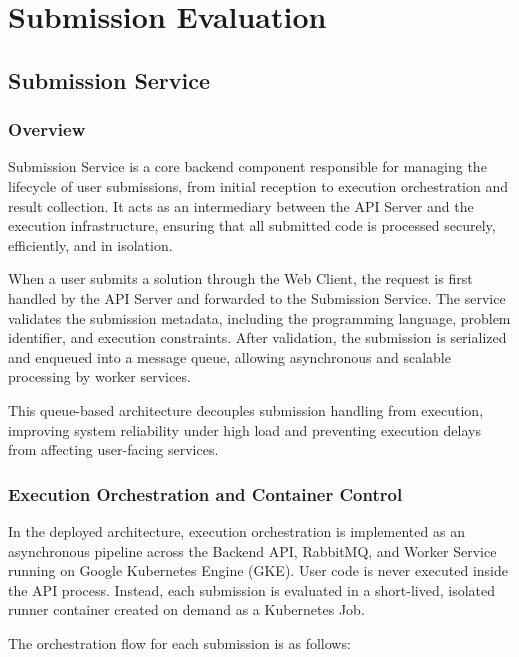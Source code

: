 \section{Submission Evaluation}

\subsection{Submission Service}
\subsubsection{Overview}
Submission Service is a core backend component responsible for managing the lifecycle of user submissions, from initial reception to execution orchestration and result collection. It acts as an intermediary between the API Server and the execution infrastructure, ensuring that all submitted code is processed securely, efficiently, and in isolation.

When a user submits a solution through the Web Client, the request is first handled by the API Server and forwarded to the Submission Service. The service validates the submission metadata, including the programming language, problem identifier, and execution constraints. After validation, the submission is serialized and enqueued into a message queue, allowing asynchronous and scalable processing by worker services.

This queue-based architecture decouples submission handling from execution, improving system reliability under high load and preventing execution delays from affecting user-facing services.

\subsubsection{Execution Orchestration and Container Control}
In the deployed architecture, execution orchestration is implemented as an asynchronous pipeline across the Backend API, RabbitMQ, and Worker Service running on Google Kubernetes Engine (GKE). User code is never executed inside the API process. Instead, each submission is evaluated in a short-lived, isolated runner container created on demand as a Kubernetes Job.

The orchestration flow for each submission is as follows:

